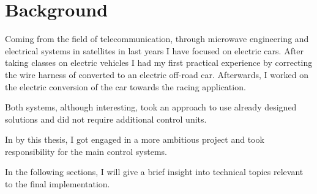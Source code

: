 









\section{Background}
Coming from the field of telecommunication, through microwave engineering and electrical systems in satellites in last years I have focused on electric cars. After taking classes on electric vehicles I had my first practical experience by correcting the wire harness of converted to an electric off-road car. Afterwards, I worked on the electric conversion of the car towards the racing application.

\noindent
Both systems, although interesting, took an approach to use already designed solutions and did not require additional control units.

\noindent
In by this thesis, I got engaged in a more ambitious project and took responsibility for the main control systems.

\noindent
In the following sections, I will give a brief insight into technical topics relevant to the final implementation.

